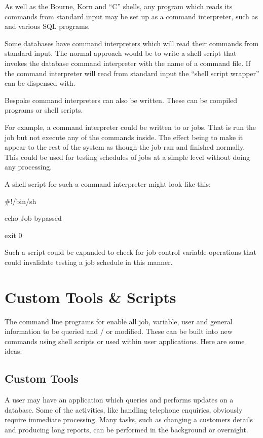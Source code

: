 As well as the Bourne, Korn and ``C'' shells, any program which reads its commands from standard input may be set up
as a command interpreter, such as  and various SQL programs.

Some databases have command interpreters which will read their commands from standard input. The normal approach would be to write a shell
script that invokes the database command interpreter with the name of a command file. If the command interpreter will read from standard input
the ``shell script wrapper'' can be dispensed with.

Bespoke command interpreters can also be written. These can be compiled programs or shell scripts.

For example, a command interpreter could be written to  or 
jobs. That is run the job but not execute any of the commands inside. The effect being to make it appear to the rest of the system as though
the job ran and finished normally. This could be used for testing schedules of jobs at a simple level without doing any processing.

A shell script for such a command interpreter might look like this:

\begin{expara}

\#!/bin/sh

\bigskip


echo Job bypassed

exit 0

\end{expara}

Such a script could be expanded to check for job control variable operations that could invalidate testing a job schedule in this manner.

\section{Custom Tools \& Scripts}
The command line programs for \ProductName{} enable all job, variable, user and general information to be queried and / or modified.
These can be built into new commands using shell scripts or used within user applications. Here are some ideas.

\subsection{Custom Tools}
A user may have an application which queries and performs updates on a database. Some of the activities, like handling telephone enquiries,
obviously require immediate processing. Many tasks, such as changing a customers details and producing long reports, can be performed in the
background or overnight.

